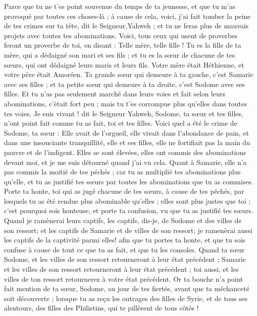 \begin{multicols}{2}
Parce que tu ne t'es point souvenue du temps de ta jeunesse, et que tu m'as provoqué par toutes ces choses-là ; à cause de cela, voici, j'ai fait tomber la peine de tes crimes sur ta tête, dit le Seigneur,Yahweh ; et tu ne feras plus de mauvais projets avec toutes tes abominations.
Voici, tous ceux qui usent de proverbes feront un proverbe de toi, en disant : Telle mère, telle fille !
Tu es la fille de ta mère, qui a dédaigné son mari et ses fils ; et tu es la sœur de chacune de tes sœurs, qui ont dédaigné leurs maris et leurs fils. Votre mère était Héthienne, et votre père était Amoréen.
Ta grande sœur qui demeure à ta gauche, c'est Samarie avec ses filles ; et ta petite sœur qui demeure à ta droite, c'est Sodome avec ses filles.
Et tu n'as pas seulement marché dans leurs voies et fait selon leurs abominations, c'était fort peu ; mais tu t'es corrompue plus qu'elles dans toutes tes voies.
Je suis vivant ! dit le Seigneur Yahweh, Sodome, ta sœur et tes filles, n'ont point fait comme tu as fait, toi et tes filles.
Voici quel a été le crime de Sodome, ta sœur : Elle avait de l'orgueil, elle vivait dans l'abondance de pain, et dans une insouciante tranquillité, elle et ses filles, elle ne fortifiait pas la main du pauvre et de l'indigent.
Elles se sont élevées, elles ont commis des abominations devant moi, et je me suis détourné quand j'ai vu cela.
Quant à Samarie, elle n'a pas commis la moitié de tes péchés ; car tu as multiplié tes abominations plus qu'elle, et tu as justifié tes sœurs par toutes les abominations que tu as commises.
Porte ta honte, toi qui as jugé chacune de tes sœurs, à cause de tes péchés, par lesquels tu as été rendue plus abominable qu'elles ; elles sont plus justes que toi ; c'est pourquoi sois honteuse, et porte ta confusion, vu que tu as justifié tes sœurs.
Quand je ramènerai leurs captifs, les captifs, dis-je, de Sodome et des villes de son ressort; et les captifs de Samarie et de villes de son ressort; je ramenèrai aussi les captifs de la captivité parmi elles!
afin que tu portes ta honte, et que tu sois confuse à cause de tout ce que tu as fait, et que tu les consoles.
Quand ta sœur Sodome, et les villes de son ressort retourneront à leur état précédent ; Samarie et les villes de son ressort retourneront à leur état précédent ; toi aussi, et les villes de ton ressort retournerez à votre état précédent.
Or ta bouche n'a point fait mention de ta sœur, Sodome, au jour de tes fiertés,
avant que ta méchanceté soit découverte ; lorsque tu as reçu les outrages des filles de Syrie, et de tous ses alentours, des filles des Philistins, qui te pillèrent de tous côtés !

\end{multicols}

